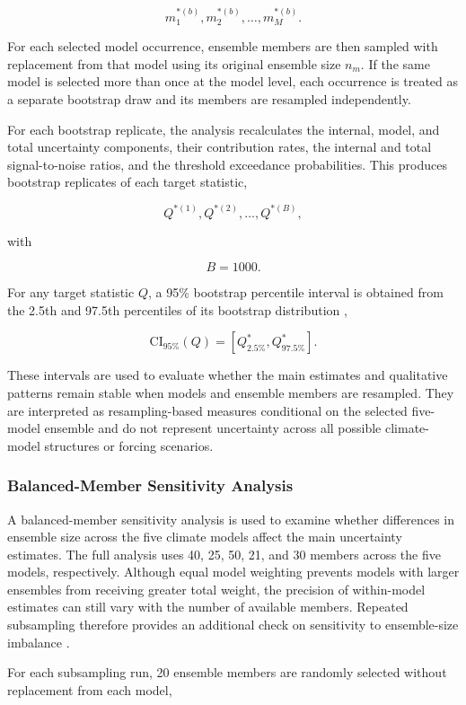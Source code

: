 \documentclass[
]{krantz}
\begin{document}
\[
m^{*(b)}_1,
m^{*(b)}_2,
\ldots,
m^{*(b)}_M.
\]

For each selected model occurrence, ensemble members are then sampled with replacement from that model using its original ensemble size \(n_m\). If the same model is selected more than once at the model level, each occurrence is treated as a separate bootstrap draw and its members are resampled independently.

For each bootstrap replicate, the analysis recalculates the internal, model, and total uncertainty components, their contribution rates, the internal and total signal-to-noise ratios, and the threshold exceedance probabilities. This produces bootstrap replicates of each target statistic,

\[
Q^{*(1)},Q^{*(2)},\ldots,Q^{*(B)},
\]

with

\[
B=1000.
\]

For any target statistic \(Q\), a 95\% bootstrap percentile interval is obtained from the 2.5th and 97.5th percentiles of its bootstrap distribution \citep{Efron1993},

\[
\mathrm{CI}_{95\%}(Q)
=
\left[
Q^*_{2.5\%},
Q^*_{97.5\%}
\right].
\]

These intervals are used to evaluate whether the main estimates and qualitative patterns remain stable when models and ensemble members are resampled. They are interpreted as resampling-based measures conditional on the selected five-model ensemble and do not represent uncertainty across all possible climate-model structures or forcing scenarios.

\subsubsection{Balanced-Member Sensitivity Analysis}\label{balanced-member-sensitivity-analysis}

A balanced-member sensitivity analysis is used to examine whether differences in ensemble size across the five climate models affect the main uncertainty estimates. The full analysis uses 40, 25, 50, 21, and 30 members across the five models, respectively. Although equal model weighting prevents models with larger ensembles from receiving greater total weight, the precision of within-model estimates can still vary with the number of available members. Repeated subsampling therefore provides an additional check on sensitivity to ensemble-size imbalance \citep{Milinski2020, Lehner2020}.

For each subsampling run, 20 ensemble members are randomly selected without replacement from each model,
\end{document}
